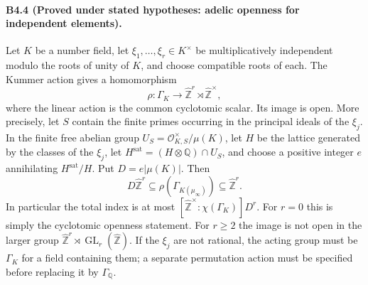 \paragraph{B4.4 (Proved under stated hypotheses: adelic openness for independent elements).}
\label{B4.4}
Let $K$ be a number field, let
$\xi_1,\dots,\xi_r\in K^\times$ be multiplicatively independent
modulo the roots of unity of $K$, and choose compatible roots of each.
The Kummer action gives a homomorphism
\[
 \rho:\Gamma_K\longrightarrow
 \widehat{\mathbb Z}^{r}\rtimes\widehat{\mathbb Z}^{\times},
\]
where the linear action is the common cyclotomic scalar.
Its image is open. More precisely, let $S$ contain the finite primes
occurring in the principal ideals of the $\xi_j$. In the finite free
abelian group
$U_S=\mathcal O_{K,S}^{\times}/\mu(K)$, let $H$ be the lattice
generated by the classes of the $\xi_j$, let
$H^{\mathrm{sat}}=(H\otimes\mathbb Q)\cap U_S$, and choose a positive
integer $e$ annihilating $H^{\mathrm{sat}}/H$. Put
$D=e|\mu(K)|$. Then
\[
 D\widehat{\mathbb Z}^{r}
 \subseteq\rho(\Gamma_{K(\mu_\infty)})
 \subseteq\widehat{\mathbb Z}^{r}.
\]
In particular the total index is at most
$[\widehat{\mathbb Z}^{\times}:\chi(\Gamma_K)]D^r$.
For $r=0$ this is simply the cyclotomic openness statement.
For $r\geq2$ the image is not open in the larger group
$\widehat{\mathbb Z}^{r}\rtimes\operatorname{GL}_r(\widehat{\mathbb Z})$.
If the $\xi_j$ are not rational, the acting group must be
$\Gamma_K$ for a field containing them; a separate permutation action
must be specified before replacing it by $\Gamma_{\mathbb Q}$.

